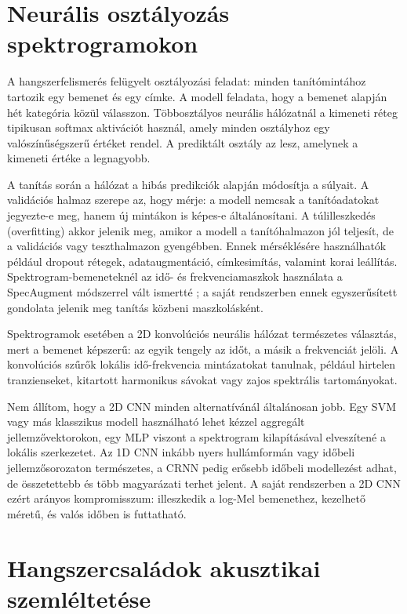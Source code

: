 \section{Neurális osztályozás spektrogramokon}
\label{sec:neuralis_osztalyozas}

A hangszerfelismerés felügyelt osztályozási feladat: minden tanítómintához tartozik egy bemenet és egy címke. A modell feladata, hogy a bemenet alapján hét kategória közül válasszon. Többosztályos neurális hálózatnál a kimeneti réteg tipikusan softmax aktivációt használ, amely minden osztályhoz egy valószínűségszerű értéket rendel. A prediktált osztály az lesz, amelynek a kimeneti értéke a legnagyobb.

A tanítás során a hálózat a hibás predikciók alapján módosítja a súlyait. A validációs halmaz szerepe az, hogy mérje: a modell nemcsak a tanítóadatokat jegyezte-e meg, hanem új mintákon is képes-e általánosítani. A túlilleszkedés (overfitting) akkor jelenik meg, amikor a modell a tanítóhalmazon jól teljesít, de a validációs vagy teszthalmazon gyengébben. Ennek mérséklésére használhatók például dropout rétegek, adataugmentáció, címkesimítás, valamint korai leállítás. Spektrogram-bemeneteknél az idő- és frekvenciamaszkok használata a SpecAugment módszerrel vált ismertté \cite{park2019specaugment}; a saját rendszerben ennek egyszerűsített gondolata jelenik meg tanítás közbeni maszkolásként.

Spektrogramok esetében a 2D konvolúciós neurális hálózat természetes választás, mert a bemenet képszerű: az egyik tengely az időt, a másik a frekvenciát jelöli. A konvolúciós szűrők lokális idő-frekvencia mintázatokat tanulnak, például hirtelen tranzienseket, kitartott harmonikus sávokat vagy zajos spektrális tartományokat.

Nem állítom, hogy a 2D CNN minden alternatívánál általánosan jobb. Egy SVM vagy más klasszikus modell használható lehet kézzel aggregált jellemzővektorokon, egy MLP viszont a spektrogram kilapításával elveszítené a lokális szerkezetet. Az 1D CNN inkább nyers hullámformán vagy időbeli jellemzősorozaton természetes, a CRNN pedig erősebb időbeli modellezést adhat, de összetettebb és több magyarázati terhet jelent. A saját rendszerben a 2D CNN ezért arányos kompromisszum: illeszkedik a log-Mel bemenethez, kezelhető méretű, és valós időben is futtatható.

\section{Hangszercsaládok akusztikai szemléltetése}
\label{subsec:hangszercsaladok}

